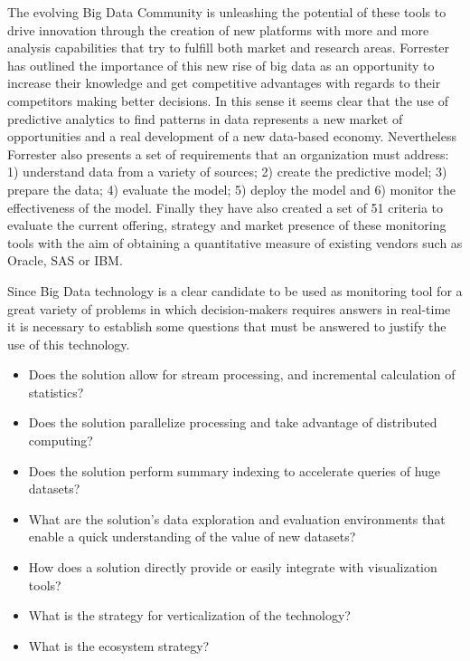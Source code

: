 The evolving Big Data Community is unleashing the potential of these tools 
to drive innovation through the creation of new platforms with more 
and more analysis capabilities that try to fulfill both market 
and research areas. Forrester has outlined the importance of 
this new rise of big data as an opportunity to increase their knowledge 
and get competitive advantages with regards to their competitors making 
better decisions. In this sense it seems clear that the use of 
predictive analytics to find patterns in data represents a new 
market of opportunities and a real development of a 
new data-based economy. Nevertheless Forrester also presents a set 
of requirements that an organization must address: 
1) understand data from a variety of sources; 2) create the predictive model; 
3) prepare the data; 4) evaluate the model; 5) deploy the model and 
6) monitor the effectiveness of the model. Finally they have also created 
a set of 51 criteria to evaluate the current offering, strategy 
and market presence of these monitoring tools with the aim of 
obtaining a quantitative measure of existing vendors such as 
Oracle, SAS or IBM.

Since Big Data technology is a clear candidate to be used as monitoring tool 
for a great variety of problems in which decision-makers requires answers 
in real-time it is necessary to establish some questions that must be 
answered to justify the use of this technology.
\begin{itemize}
 \item Does the solution allow for stream processing, and incremental calculation of statistics?
 \item Does the solution parallelize processing and take advantage of distributed computing?
 \item Does the solution perform summary indexing to accelerate queries of huge datasets?
 \item What are the solution's data exploration and evaluation environments that enable a quick understanding of the value of new datasets?
 \item How does a solution directly provide or easily integrate with visualization tools?
 \item What is the strategy for verticalization of the technology?
 \item What is the ecosystem strategy? 
\end{itemize}


% 
% 
% 
% 
